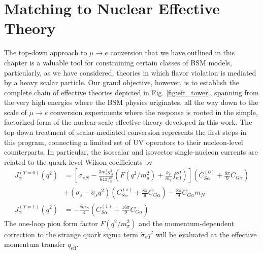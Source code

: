 \documentclass{book}[letterpaper,12pt]
\begin{document}
\section{Matching to Nuclear Effective Theory}
The top-down approach to $\mu\rightarrow e$ conversion that we have outlined in this chapter is a valuable tool for constraining certain classes of BSM models, particularly, as we have considered, theories in which flavor violation is mediated by a heavy scalar particle. Our grand objective, however, is to establish the complete chain of effective theories depicted in Fig. \ref{fig:eft_tower}, spanning from the very high energies where the BSM physics originates, all the way down to the scale of $\mu\rightarrow e$ conversion experiments where the response is rooted in the simple, factorized form of the nuclear-scale effective theory developed in this work. The top-down treatment of scalar-mediated conversion represents the first steps in this program, connecting a limited set of UV operators to their nucleon-level counterparts. In particular, the isoscalar and isovector single-nucleon currents are related to the quark-level Wilson coefficients by 
\begin{equation}
\begin{split}
J_{\alpha}^{(T=0)}(q^2)&=\left[\sigma_{\pi N}-\frac{3m_{\pi}^3g_A^2}{64\pi f_{\pi}^2}\left(F\left(q^2/m_{\pi}^2\right)+\frac{k_F}{m_{\pi}}f^{SI}_\mathrm{eff}\right)\right]\left(C^{(0)}_{S\alpha}+\frac{8\pi}{9}C_{G\alpha}\right)\\
&+\left(\sigma_s-\dot{\sigma}_sq^2\right)\left(C^{(s)}_{S\alpha}+\frac{8\pi}{9}C_{G\alpha}\right)-\frac{8\pi}{9}C_{G\alpha}m_N\\
J_{\alpha}^{(T=1)}(q^2)&=-\frac{\delta m_N}{4}\left(C_{S\alpha}^{(1)}+\frac{16\pi}{9}C_{G\alpha}\right)
\end{split}
\end{equation}
The one-loop pion form factor $F(q^2/m_{\pi}^2)$ and the momentum-dependent correction to the strange quark sigma term $\dot{\sigma}_sq^2$ will be evaluated at the effective momentum transfer $q_\mathrm{eff}$.
\end{document}
